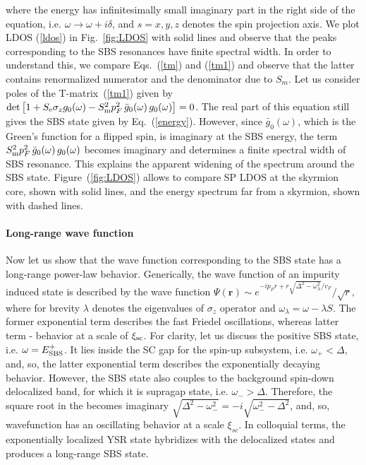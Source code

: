\documentclass[twocolumn,showpacs,floatfix,longbibliography]{revtex4-1}
\begin{document}
 where the energy has infinitesimally small imaginary part in the right side of the equation, i.e. $\omega\rightarrow \omega+i\delta$, and $s=x,y,z$ denotes the spin projection axis. We plot LDOS (\ref{ldos}) in Fig.~\ref{fig:LDOS} with solid lines and observe that the peaks corresponding to the SBS resonances have finite spectral width. In order to understand this, we compare Eqs.~(\ref{tm}) and (\ref{tm1}) and observe that the latter contains renormalized numerator and the denominator due to $S_m$. Let us consider poles of the T-matrix~(\ref{tm1}) given by ${\rm det}\left[1+S_{\rm e}\sigma_zg_{0}(\omega)-S^2_{\rm m}p_F^2\,\bar g_{0}(\omega)\, g_{0}(\omega)\right]=0$. The real part of this equation still gives the SBS state given by Eq.~(\ref{energy}). However, since $\bar g_0(\omega)$, which is the Green's function for a flipped spin, is imaginary at the SBS energy, the term $S^2_{\rm m}p_F^2\,\bar g_{0}(\omega)\, g_{0}(\omega)$ becomes imaginary and determines a finite spectral width of SBS resonance. This explains the apparent widening of the spectrum around the SBS state.  Figure~(\ref{fig:LDOS}) allows to compare SP LDOS at the skyrmion core, shown with solid lines, and the energy spectrum far from a skyrmion, shown with dashed lines.   

\paragraph*{Long-range wave function} \label{sec:wavefuncion} 

Now let us show that the wave function corresponding to the SBS state has a long-range power-law behavior. Generically, the wave function of an impurity induced state is described by the wave function  
$
	\Psi(\bm r) \sim e^{-ip_Fr+r\sqrt{\Delta^2-\omega^2_\lambda}/v_F}/\sqrt{r},
$
where for brevity $\lambda$ denotes the eigenvalues of $\sigma_z$ operator and $\omega_\lambda = \omega - \lambda S$. The former exponential term describes the fast Friedel oscillations, whereas latter term - behavior at a scale of $\xi_{\rm sc}$. For clarity, let us discuss the positive SBS state, i.e. $\omega = E^{+}_{\rm SBS}$. It lies inside the SC gap for the spin-up subsystem, i.e. $\omega_+<\Delta$, and, so, the latter exponential term describes the exponentially decaying behavior. However, the SBS state also couples to the background spin-down delocalized band, for which it is supragap state, i.e. $\omega_->\Delta$. Therefore, the square root in the becomes imaginary $\sqrt{\Delta^2-\omega^2_-}=-i\sqrt{\omega^2_- - \Delta^2}$, and, so, wavefunction has an oscillating behavior at a scale $\xi_{sc}$. In colloquial terms, the exponentially localized YSR state hybridizes with the delocalized states and produces a long-range SBS state.
\end{document}
